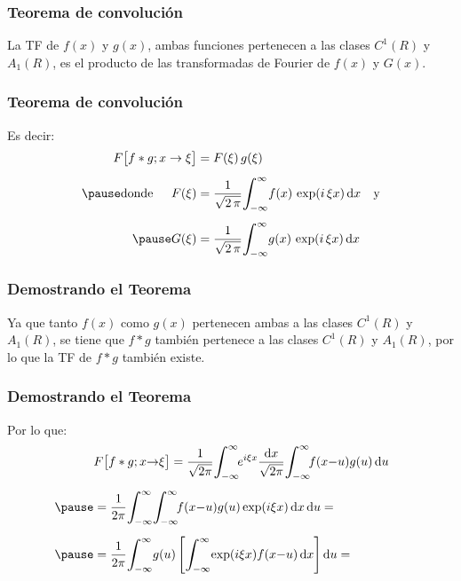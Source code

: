 \begin{frame}
\frametitle{Teorema de convolución}
La TF de $f (x)$ y $g (x)$, ambas funciones pertenecen a las clases $C^{1}(R)$ y $A_{1}(R)$, \pause es el producto de las transformadas de Fourier de $f (x)$ y $G (x)$.
\end{frame}
\begin{frame}
\frametitle{Teorema de convolución}
Es decir:
\pause
\begin{eqnarray*}
\begin{aligned}
F \big[f * g; x \to \xi \big] &= F (\xi) \, g (\xi) \\[0.5em] \pause
\mbox{donde } \hspace{0.4cm} F (\xi) &= \dfrac{1}{\sqrt{2 \, \pi}} \scaleint{6ex}_{\bs -\infty}^{\infty} f (x) \, \exp(i \, \xi x) \dd{x} \hspace{0.3cm} \mbox{y} \\[0.5em] \pause
G (\xi) &= \dfrac{1}{\sqrt{2 \, \pi}} \scaleint{6ex}_{\bs -\infty}^{\infty} g (x) \, \exp(i \, \xi x) \dd{x}
\end{aligned}
\end{eqnarray*}
\end{frame}
\begin{frame}
\frametitle{Demostrando el Teorema}
Ya que tanto $f (x)$ como $g (x)$ pertenecen ambas a las clases $C^{1}(R)$ y $A_{1}(R)$, \pause se tiene que $f * g$ también pertenece a las clases $C^{1}(R)$ y $A_{1}(R)$, \pause por lo que la TF de $f * g$ también existe.
\end{frame}
\begin{frame}
\frametitle{Demostrando el Teorema}
Por lo que:
\pause
\begin{eqnarray*}
\hspace*{-0.5cm}
\begin{aligned}
&F \big[f * g; x {\to} \xi \big] = \dfrac{1}{\sqrt{2 \pi}} \scaleint{6ex}_{\bs -\infty}^{\infty} \! e^{i  \xi x} \dfrac{\dd{x}}{\sqrt{2 \pi}} \scaleint{6ex}_{\bs -\infty}^{\infty} \! f (x {-} u) g (u) \dd{u} \\[0.5em] \pause
&= \dfrac{1}{2 \pi} \scaleint{6ex}_{\bs -\infty}^{\infty} \scaleint{6ex}_{\bs -\infty}^{\infty} \! f (x {-} u) g (u) \exp(i \xi x) \dd{x} \dd{u} = \\[0.5em] \pause
&= \dfrac{1}{2 \pi} \scaleint{6ex}_{\bs -\infty}^{\infty} g (u) \left[ \scaleint{6ex}_{\bs -\infty}^{\infty} \! \exp(i \xi x) f (x {-} u) \dd{x} \right] \dd{u} = 
\end{aligned}
\end{eqnarray*}
\end{frame}
